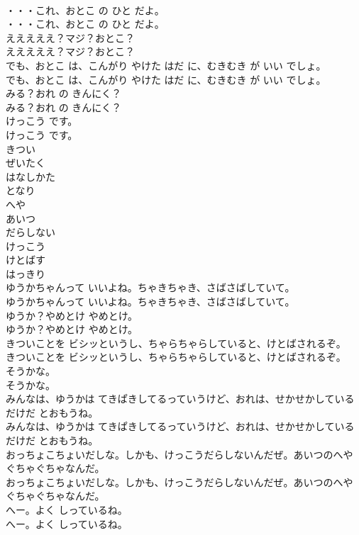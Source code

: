 \documentclass[8pt]{extreport}
\begin{document}
\begin{CJK}{UTF8}{min}
\\	・・・これ、おとこ の ひと だよ。
\\	・・・これ、おとこ の ひと だよ。
\\	えええええ？マジ？おとこ？
\\	えええええ？マジ？おとこ？
\\	でも、おとこ は、こんがり やけた はだ に、むきむき が いい でしょ。
\\	でも、おとこ は、こんがり やけた はだ に、むきむき が いい でしょ。
\\	みる？おれ の きんにく？
\\	みる？おれ の きんにく？
\\	けっこう です。
\\	けっこう です。
\\	きつい
\\	ぜいたく
\\	はなしかた
\\	となり
\\	へや
\\	あいつ
\\	だらしない
\\	けっこう
\\	けとばす
\\	はっきり
\\	ゆうかちゃんって いいよね。ちゃきちゃき、さばさばしていて。
\\	ゆうかちゃんって いいよね。ちゃきちゃき、さばさばしていて。
\\	ゆうか？やめとけ やめとけ。
\\	ゆうか？やめとけ やめとけ。
\\	きついことを ビシッというし、ちゃらちゃらしていると、けとばされるぞ。
\\	きついことを ビシッというし、ちゃらちゃらしていると、けとばされるぞ。
\\	そうかな。
\\	そうかな。
\\	みんなは、ゆうかは てきぱきしてるっていうけど、おれは、せかせかしているだけだ とおもうね。
\\	みんなは、ゆうかは てきぱきしてるっていうけど、おれは、せかせかしているだけだ とおもうね。
\\	おっちょこちょいだしな。しかも、けっこうだらしないんだぜ。あいつのへや ぐちゃぐちゃなんだ。
\\	おっちょこちょいだしな。しかも、けっこうだらしないんだぜ。あいつのへや ぐちゃぐちゃなんだ。
\\	へー。よく しっているね。
\\	へー。よく しっているね。

\end{CJK}
\end{document}
